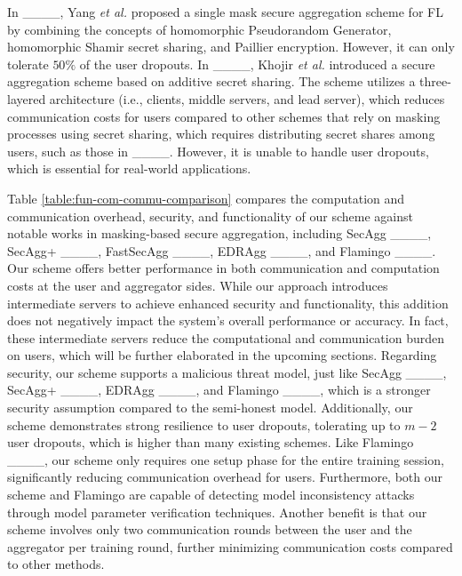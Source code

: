 In ____, Yang \emph{et al.} proposed a single mask secure aggregation scheme for FL by combining the concepts of homomorphic Pseudorandom Generator, homomorphic Shamir secret sharing, and Paillier encryption. However, it can only tolerate $50\%$ of the user dropouts. In ____, Khojir \emph{et al.} introduced a secure aggregation scheme based on additive secret sharing. The scheme utilizes a three-layered architecture (i.e., clients, middle servers, and lead server), which reduces communication costs for users compared to other schemes that rely on masking processes using secret sharing, which requires distributing secret shares among users, such as those in ____. However, it is unable to handle user dropouts, which is essential for real-world applications.
\par 

Table \ref{table:fun-com-commu-comparison} compares the computation and communication overhead, security, and functionality of our scheme against notable works in masking-based secure aggregation, including SecAgg ____, SecAgg+ ____, FastSecAgg ____, EDRAgg ____, and Flamingo ____. Our scheme offers better performance in both communication and computation costs at the user and aggregator sides. While our approach introduces intermediate servers to achieve enhanced security and functionality, this addition does not negatively impact the system's overall performance or accuracy. In fact, these intermediate servers reduce the computational and communication burden on users, which will be further elaborated in the upcoming sections. 
Regarding security, our scheme supports a malicious threat model, just like SecAgg ____, SecAgg+ ____, EDRAgg ____, and Flamingo ____, which is a stronger security assumption compared to the semi-honest model. Additionally, our scheme demonstrates strong resilience to user dropouts, tolerating up to $m-2$ user dropouts, which is higher than many existing schemes. Like Flamingo ____, our scheme only requires one setup phase for the entire training session, significantly reducing communication overhead for users.
Furthermore, both our scheme and Flamingo are capable of detecting model inconsistency attacks through model parameter verification techniques. Another benefit is that our scheme involves only two communication rounds between the user and the aggregator per training round, further minimizing communication costs compared to other methods.


